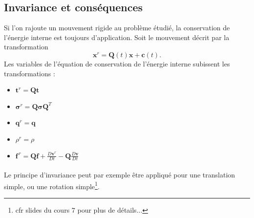 \subsection{Invariance et conséquences}
Si l'on rajoute un mouvement rigide au problème étudié, la conservation de l'énergie interne est toujours d'application. Soit le mouvement décrit par la transformation
$$\textbf{x}^r=\textbf{Q}(t)\textbf{x}+\textbf{c}(t).$$ Les variables de l'équation de conservation de l'énergie interne subissent les transformations :
\begin{itemize}
\item $\textbf{t}^r=\textbf{Q}\textbf{t}$
\item $\boldsymbol{\sigma}^r=\textbf{Q}\boldsymbol{\sigma}\textbf{Q}^T$
\item $\textbf{q}^r=\textbf{q}$
\item $\rho^r=\rho$
\item $\textbf{f}^{\,r}=\textbf{Q}\textbf{f}+\frac{D\textbf{v}^r}{Dt}-\textbf{Q}\frac{D\textbf{v}}{Dt}$
\end{itemize}
 \paragraph{}
Le principe d'invariance peut par exemple être appliqué pour une translation simple, ou une rotation simple\footnote{cfr slides du cours 7 pour plus de détails...}. 

